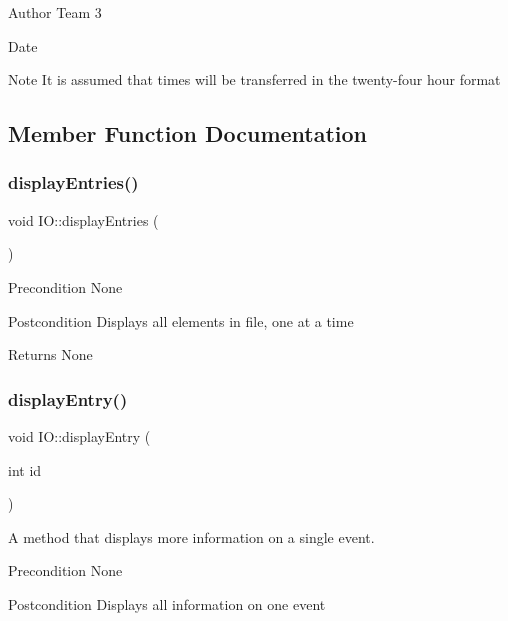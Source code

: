 \begin{DoxyAuthor}{Author}
Team 3 
\end{DoxyAuthor}
\begin{DoxyDate}{Date}

\end{DoxyDate}
\begin{DoxyNote}{Note}
It is assumed that times will be transferred in the twenty-\/four hour format 
\end{DoxyNote}


\subsection{Member Function Documentation}
\mbox{\label{classIO_a48e9febfbb2c6c3e01b467fd030c2529}} 
\subsubsection{\texorpdfstring{display\+Entries()}{displayEntries()}}
{\footnotesize\ttfamily void I\+O\+::display\+Entries (\begin{DoxyParamCaption}{ }\end{DoxyParamCaption})}

\begin{DoxyPrecond}{Precondition}
None 
\end{DoxyPrecond}
\begin{DoxyPostcond}{Postcondition}
Displays all elements in file, one at a time 
\end{DoxyPostcond}
\begin{DoxyReturn}{Returns}
None 
\end{DoxyReturn}
\mbox{\label{classIO_ad7d41c6f82af93956476883f9291a444}} 
\subsubsection{\texorpdfstring{display\+Entry()}{displayEntry()}}
{\footnotesize\ttfamily void I\+O\+::display\+Entry (\begin{DoxyParamCaption}\item[{int}]{id }\end{DoxyParamCaption})}

A method that displays more information on a single event. \begin{DoxyPrecond}{Precondition}
None 
\end{DoxyPrecond}
\begin{DoxyPostcond}{Postcondition}
Displays all information on one event 
\end{DoxyPostcond}

